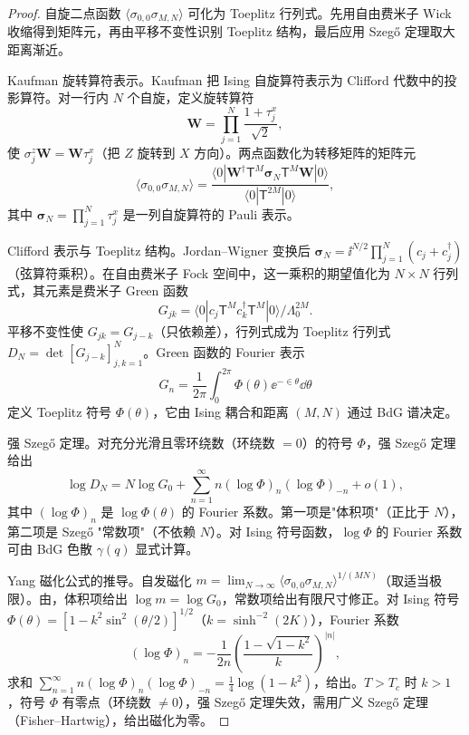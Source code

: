 \begin{proof}
自旋二点函数 \(\langle\sigma_{0,0}\sigma_{M,N}\rangle\) 可化为 Toeplitz 行列式。先用自由费米子 Wick 收缩得到矩阵元，再由平移不变性识别 Toeplitz 结构，最后应用 Szegő 定理取大距离渐近。

Kaufman 旋转算符表示。Kaufman 把 Ising 自旋算符表示为 Clifford 代数中的投影算符。对一行内 \(N\) 个自旋，定义旋转算符
\begin{equation*}
  \mathbf W=\prod_{j=1}^N\frac{1+\tau_j^x}{\sqrt2},
\end{equation*}
使 \(\sigma_j^z\mathbf W=\mathbf W\tau_j^x\)（把 \(Z\) 旋转到 \(X\) 方向）。两点函数化为转移矩阵的矩阵元
\begin{equation*}
  \langle\sigma_{0,0}\sigma_{M,N}\rangle=\frac{\langle0|\mathbf W^\dagger\mathsf T^M\boldsymbol\sigma_N\mathsf T^M\mathbf W|0\rangle}{\langle0|\mathsf T^{2M}|0\rangle},
\end{equation*}
其中 \(\boldsymbol\sigma_N=\prod_{j=1}^N\tau_j^x\) 是一列自旋算符的 Pauli 表示。

Clifford 表示与 Toeplitz 结构。Jordan--Wigner 变换后 \(\boldsymbol\sigma_N=\ii^{N/2}\prod_{j=1}^N(c_j+c_j^\dagger)\)（弦算符乘积）。在自由费米子 Fock 空间中，这一乘积的期望值化为 \(N\times N\) 行列式，其元素是费米子 Green 函数
\begin{equation*}
  G_{jk}=\langle0|c_j\mathsf T^M c_k^\dagger\mathsf T^M|0\rangle/\Lambda_0^{2M}.
\end{equation*}
平移不变性使 \(G_{jk}=G_{j-k}\)（只依赖差），行列式成为 Toeplitz 行列式 \(D_N=\det[G_{j-k}]_{j,k=1}^N\)。Green 函数的 Fourier 表示
\begin{equation*}
  G_n=\frac{1}{2\pi}\int_0^{2\pi}\Phi(\theta)\ee^{-\in\theta}\dd\theta
\end{equation*}
定义 Toeplitz 符号 \(\Phi(\theta)\)，它由 Ising 耦合和距离 \((M,N)\) 通过 BdG 谱决定。

强 Szegő 定理。对充分光滑且零环绕数（环绕数 \(=0\)）的符号 \(\Phi\)，强 Szegő 定理给出
\begin{equation}
  \log D_N=N\log G_0+\sum_{n=1}^\infty n(\log\Phi)_n(\log\Phi)_{-n}+o(1),
  \label{eq:phys-sm-szego-strong}
\end{equation}
其中 \((\log\Phi)_n\) 是 \(\log\Phi(\theta)\) 的 Fourier 系数。第一项是"体积项"（正比于 \(N\)），第二项是 Szegő "常数项"（不依赖 \(N\)）。对 Ising 符号函数，\(\log\Phi\) 的 Fourier 系数可由 BdG 色散 \(\gamma(q)\) 显式计算。

Yang 磁化公式的推导。自发磁化 \(m=\lim_{N\to\infty}\langle\sigma_{0,0}\sigma_{M,N}\rangle^{1/(MN)}\)（取适当极限）。由，体积项给出 \(\log m=\log G_0\)，常数项给出有限尺寸修正。对 Ising 符号 \(\Phi(\theta)=[1-k^2\sin^2(\theta/2)]^{1/2}\)（\(k=\sinh^{-2}(2K)\)），Fourier 系数
\begin{equation*}
  (\log\Phi)_n=-\frac{1}{2n}\left(\frac{1-\sqrt{1-k^2}}{k}\right)^{|n|},
\end{equation*}
求和 \(\sum_{n=1}^\infty n(\log\Phi)_n(\log\Phi)_{-n}=\frac{1}{4}\log(1-k^2)\)，给出。\(T>T_c\) 时 \(k>1\)，符号 \(\Phi\) 有零点（环绕数 \(\neq0\)），强 Szegő 定理失效，需用广义 Szegő 定理（Fisher--Hartwig），给出磁化为零。


\end{proof}
